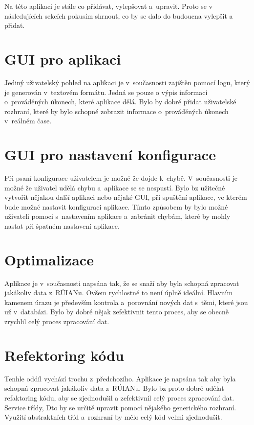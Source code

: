 \label{cha:NavrhDoBudoucna}
Na této aplikaci je stále co přidávat, vylepšovat a~upravit.
Proto se v následujících sekcích pokusím shrnout, co by se 
dalo do budoucna vylepšit a přidat.

\section*{GUI pro aplikaci}
Jediný uživatelský pohled na aplikaci je v~současnosti zajištěn pomocí 
logu, který je generován v~textovém formátu. Jedná se pouze o výpis
informací o~prováděných úkonech, které aplikace dělá.
Bylo by dobré přidat uživatelské rozhraní, které by bylo schopné
zobrazit informace o~prováděných úkonech v~reálném čase.


\section*{GUI pro nastavení konfigurace}
Při psaní konfigurace uživatelem je možné že dojde k~chybě.
V~současnosti je možné že uživatel udělá chybu a~aplikace se 
se nespustí. Bylo bz užitečné vytvořit nějakou další aplikaci nebo nějaké GUI,
při spuštění aplikace, ve kterém bude možné nastavit konfiguraci aplikace.
Tímto způsobem by bylo možné uživateli pomoci s~nastavením aplikace
a~zabránit chybám, které by mohly nastat při špatném nastavení aplikace.


\section*{Optimalizace}
Aplikace je v~současnosti napsána tak, že se snaží aby byla schopná
zpracovat jakákoliv data z~RÚIANu. Ovšem rychlostně to není
úplně ideální. Hlavním kamenem úrazu je především kontrola
a~porovnání nových dat s~těmi, které jsou už v~databázi.
Bylo by dobré nějak zefektivnit tento proces, aby se obecně zrychlil
celý proces zpracování dat.


\section*{Refektoring kódu}
Tenhle oddíl vychází trochu z~předchozího. Aplikace je napsána
tak aby byla schopná zpracovat jakákoliv data z~RÚIANu.
Bylo bz proto dobré udělat refaktoring kódu, aby se zjednodušil
a zefektivnil celý proces zpracování dat. Service třídy, Dto 
by se určitě upravit pomocí nějakého generického rozhraní.
Využití abstraktních tříd a~rozhraní by mělo celý kód velmi
zjednodušit.


